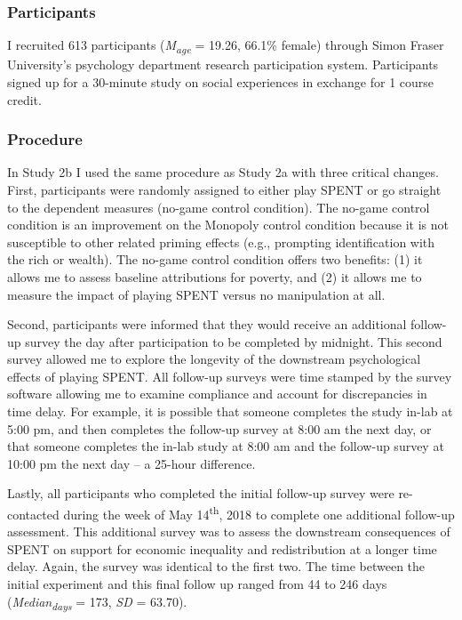\documentclass{sfuthesis}
\begin{document}
\subsubsection{Participants}

I recruited 613 participants (\textit{M\textsubscript{age}} = 19.26, 66.1\% female) through Simon Fraser University’s psychology department research participation system. Participants signed up for a 30-minute study on social experiences in exchange for 1 course credit. 

\subsubsection{Procedure}

In Study 2b I used the same procedure as Study 2a with three critical changes. First, participants were randomly assigned to either play SPENT or go straight to the dependent measures (no-game control condition). The no-game control condition is an improvement on the Monopoly control condition because it is not susceptible to other related priming effects (e.g., prompting identification with the rich or wealth). The no-game control condition offers two benefits: (1) it allows me to assess baseline attributions for poverty, and (2) it allows me to measure the impact of playing SPENT versus no manipulation at all.

Second, participants were informed that they would receive an additional follow-up survey the day after participation to be completed by midnight. This second survey allowed me to explore the longevity of the downstream psychological effects of playing SPENT. All follow-up surveys were time stamped by the survey software allowing me to examine compliance and account for discrepancies in time delay. For example, it is possible that someone completes the study in-lab at 5:00 pm, and then completes the follow-up survey at 8:00 am the next day, or that someone completes the in-lab study at 8:00 am and the follow-up survey at 10:00 pm the next day – a 25-hour difference.
 
Lastly, all participants who completed the initial follow-up survey were re-contacted during the week of May 14\textsuperscript{th}, 2018 to complete one additional follow-up assessment. This additional survey was to assess the downstream consequences of SPENT on support for economic inequality and redistribution at a longer time delay. Again, the survey was identical to the first two. The time between the initial experiment and this final follow up ranged from 44 to 246 days (\textit{Median\textsubscript{days}} = 173, \textit{SD} = 63.70).
\end{document}

